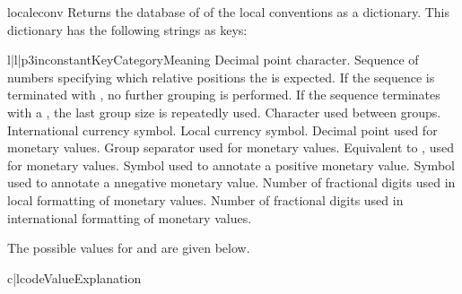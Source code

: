 \begin{funcdesc}{localeconv}{}
  Returns the database of of the local conventions as a dictionary.
  This dictionary has the following strings as keys:

  \begin{tableiii}{l|l|p{3in}}{constant}{Key}{Category}{Meaning}
            {Decimal point character.}
            {Sequence of numbers specifying which relative positions
             the  is expected.  If the sequence is
             terminated with , no further grouping
             is performed. If the sequence terminates with a , 
             the last group size is repeatedly used.}
            {Character used between groups.}\hline
            {International currency symbol.}
            {Local currency symbol.}
            {Decimal point used for monetary values.}
            {Group separator used for monetary values.}
            {Equivalent to , used for monetary
             values.}
            {Symbol used to annotate a positive monetary value.}
            {Symbol used to annotate a nnegative monetary value.}
            {Number of fractional digits used in local formatting
             of monetary values.}
            {Number of fractional digits used in international
             formatting of monetary values.}
  \end{tableiii}

  The possible values for  and
   are given below.

  \begin{tableii}{c|l}{code}{Value}{Explanation}
  \end{tableii}
\end{funcdesc}

